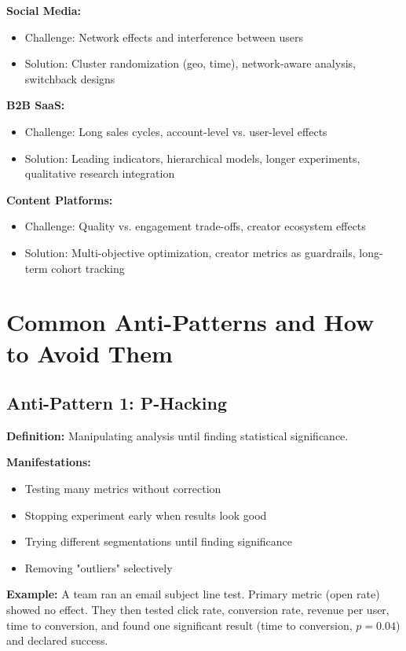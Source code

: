 \textbf{Social Media:}
\begin{itemize}
    \item Challenge: Network effects and interference between users
    \item Solution: Cluster randomization (geo, time), network-aware analysis, switchback designs
\end{itemize}

\textbf{B2B SaaS:}
\begin{itemize}
    \item Challenge: Long sales cycles, account-level vs. user-level effects
    \item Solution: Leading indicators, hierarchical models, longer experiments, qualitative research integration
\end{itemize}

\textbf{Content Platforms:}
\begin{itemize}
    \item Challenge: Quality vs. engagement trade-offs, creator ecosystem effects
    \item Solution: Multi-objective optimization, creator metrics as guardrails, long-term cohort tracking
\end{itemize}

\section{Common Anti-Patterns and How to Avoid Them}

\subsection{Anti-Pattern 1: P-Hacking}

\textbf{Definition:} Manipulating analysis until finding statistical significance.

\textbf{Manifestations:}
\begin{itemize}
    \item Testing many metrics without correction
    \item Stopping experiment early when results look good
    \item Trying different segmentations until finding significance
    \item Removing "outliers" selectively
\end{itemize}

\textbf{Example:} A team ran an email subject line test. Primary metric (open rate) showed no effect. They then tested click rate, conversion rate, revenue per user, time to conversion, and found one significant result (time to conversion, $p=0.04$) and declared success.

